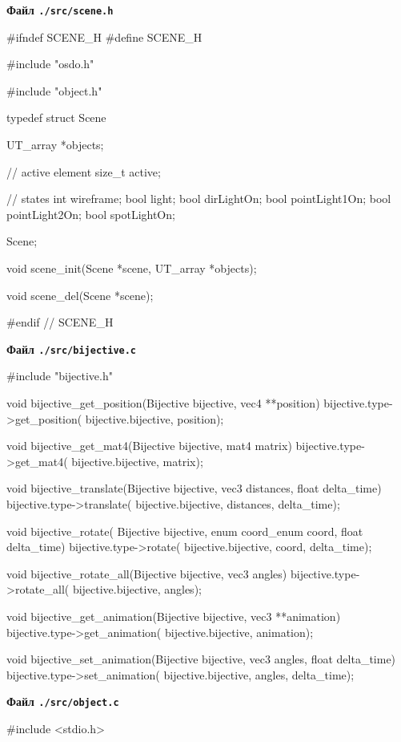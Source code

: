 \documentclass[14pt,a4paper]{extarticle}
\theoremstyle{definition}
\renewcommand{\[}{\begin{singlespace}\begin{equation*}}
\renewcommand{\]}{\end{equation*}\end{singlespace}}
\begin{document}
\begin{multicols}{2}
\noindent\cprotect\textbf{Файл \verb+./src/scene.h+}
\begin{ccode}
#ifndef SCENE_H
#define SCENE_H

#include "osdo.h"

#include "object.h"

typedef struct Scene {
    UT_array *objects;

    // active element
    size_t active;

    // states
    int wireframe;
    bool light;
    bool dirLightOn;
    bool pointLight1On;
    bool pointLight2On;
    bool spotLightOn;
} Scene;

void scene_init(Scene *scene, UT_array *objects);

void scene_del(Scene *scene);

#endif // SCENE_H
\end{ccode}
\noindent\cprotect\textbf{Файл \verb+./src/bijective.c+}
\begin{ccode}
#include "bijective.h"

void bijective_get_position(Bijective bijective, vec4 **position) {
    bijective.type->get_position(
                bijective.bijective, position);
}

void bijective_get_mat4(Bijective bijective, mat4 matrix) {
    bijective.type->get_mat4(
                bijective.bijective, matrix);
}

void bijective_translate(Bijective bijective, vec3 distances, float delta_time) {
    bijective.type->translate(
                bijective.bijective, distances, delta_time);
}

void bijective_rotate(
        Bijective bijective, enum coord_enum coord, float delta_time) {
    bijective.type->rotate(
                bijective.bijective, coord, delta_time);
}

void bijective_rotate_all(Bijective bijective, vec3 angles) {
    bijective.type->rotate_all(
                bijective.bijective, angles);
}

void bijective_get_animation(Bijective bijective, vec3 **animation) {
    bijective.type->get_animation(
                bijective.bijective, animation);
}

void bijective_set_animation(Bijective bijective, vec3 angles, float delta_time) {
    bijective.type->set_animation(
                bijective.bijective, angles, delta_time);
}
\end{ccode}
\noindent\cprotect\textbf{Файл \verb+./src/object.c+}
\begin{ccode}
#include <stdio.h>


\end{ccode}
\end{multicols}
\end{document}
